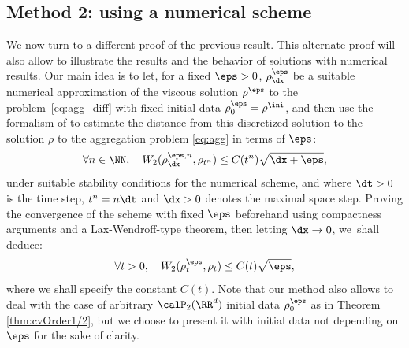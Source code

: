 \subsection{Method 2: using a numerical scheme}\label{section:lambdaConvex:2}

We now turn to a different proof of the previous result. This alternate proof will also allow to illustrate the results and the behavior of solutions with numerical results. Our main idea is to let, for a fixed $\eps>0$, $\rho_{\dx}^\eps$ be a suitable numerical approximation of the viscous solution $\rho^\eps$ to the problem~\eqref{eq:agg_diff} with fixed initial data $\rho_0^\eps = \rho^{\ini}$, and then use the formalism of \cite{dlv20} to estimate the distance from this discretized solution to the solution $\rho$ to the aggregation problem \eqref{eq:agg} in terms of $\eps$:
\[
\forall n \in \NN, \quad W_2(\rho_{\dx}^{\eps,n}, \rho_{t^n}) \leq C(t^n) \sqrt{\dx + \eps},
\]
under suitable stability conditions for the numerical scheme, and where $\dt>0$ is the time step, $t^n = n\dt$ and $\dx>0$ denotes the maximal space step. Proving the convergence of the scheme with fixed $\eps$ beforehand using compactness arguments and a Lax-Wendroff-type theorem, then letting $\dx \to 0$, we~shall deduce:
\[
\forall t>0, \quad W_2(\rho_t^\eps, \rho_t) \leq C(t) \sqrt{\eps},
\]
where we shall specify the constant $C(t)$. Note that our method also allows to deal with the case of arbitrary $\calP_2(\RR^d)$ initial data $\rho_0^\eps$ as in Theorem \ref{thm:cvOrder1/2}, but we choose to present it with initial data not depending on $\eps$ for the sake of clarity.

